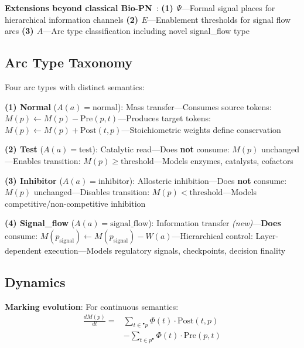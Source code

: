\vspace{3pt}
\noindent\textbf{Extensions beyond classical Bio-PN}~\cite{heiner2008}: \textbf{(1) $\Psi$}---Formal signal places for hierarchical information channels \textbf{(2) $E$}---Enablement thresholds for signal flow arcs \textbf{(3) $A$}---Arc type classification including novel signal\_flow type

\subsection{Arc Type Taxonomy}

\vspace{3pt}
\noindent Four arc types with distinct semantics:

\vspace{3pt}
\noindent\textbf{(1) Normal} ($A(a) = \text{normal}$): Mass transfer---Consumes source tokens: $M(p) \gets M(p) - \text{Pre}(p, t)$---Produces target tokens: $M(p) \gets M(p) + \text{Post}(t, p)$---Stoichiometric weights define conservation

\vspace{3pt}
\noindent\textbf{(2) Test} ($A(a) = \text{test}$): Catalytic read---Does \textbf{not} consume: $M(p)$ unchanged---Enables transition: $M(p) \geq \text{threshold}$---Models enzymes, catalysts, cofactors

\vspace{3pt}
\noindent\textbf{(3) Inhibitor} ($A(a) = \text{inhibitor}$): Allosteric inhibition---Does \textbf{not} consume: $M(p)$ unchanged---Disables transition: $M(p) < \text{threshold}$---Models competitive/non-competitive inhibition

\vspace{3pt}
\noindent\textbf{(4) Signal\_flow} ($A(a) = \text{signal\_flow}$): Information transfer \textit{(new)}---\textbf{Does} consume: $M(p_{\text{signal}}) \gets M(p_{\text{signal}}) - W(a)$---Hierarchical control: Layer-dependent execution---Models regulatory signals, checkpoints, decision finality

\subsection{Dynamics}

\vspace{3pt}
\noindent\textbf{Marking evolution}: For continuous semantics:
\begin{align*}
\frac{dM(p)}{dt} = &\sum_{t \in {}^\bullet p} \Phi(t) \cdot \text{Post}(t, p) \\
&- \sum_{t \in p^\bullet} \Phi(t) \cdot \text{Pre}(p, t)
\end{align*}

